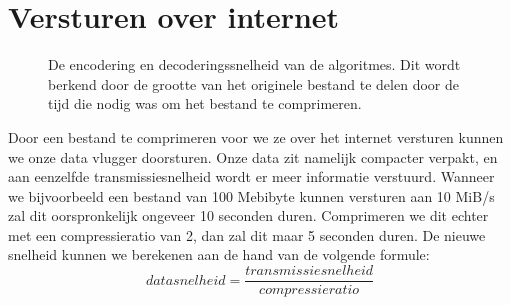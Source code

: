 \documentclass[a4paper]{article}
\begin{document}
\section{Versturen over internet}

\begin{figure}[H]
    \centering
\caption{De encodering en decoderingssnelheid van de algoritmes. Dit wordt berkend door de grootte van het originele bestand te delen door de tijd die nodig was om het bestand te comprimeren.}
\end{figure}


Door een bestand te comprimeren voor we ze over het internet versturen kunnen we onze data vlugger doorsturen. Onze data zit namelijk compacter verpakt, en aan eenzelfde transmissiesnelheid wordt er meer informatie verstuurd. Wanneer we bijvoorbeeld een bestand van 100 Mebibyte kunnen versturen aan 10 MiB/s zal dit oorspronkelijk ongeveer 10 seconden duren. Comprimeren we dit echter met een compressieratio van 2, dan zal dit maar 5 seconden duren. De nieuwe snelheid kunnen we berekenen aan de hand van de volgende formule:
$$ datasnelheid = \frac{transmissiesnelheid}{compressieratio} $$
\end{document}
